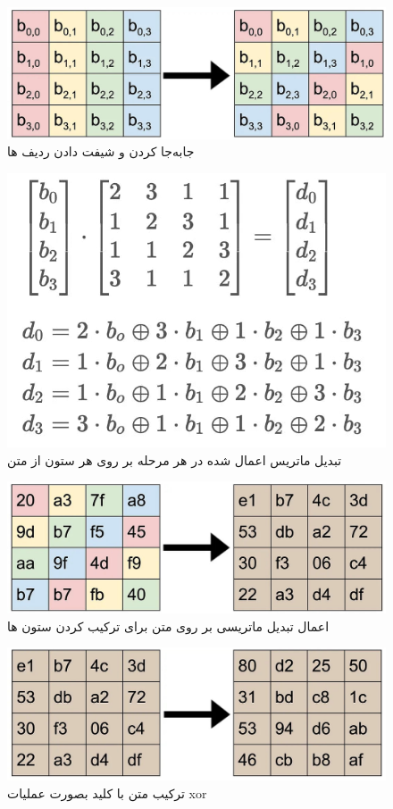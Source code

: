 \begin{figure}[h!]
    \centering
    \includegraphics[width=0.5\linewidth]{images/Shift rows.jpg}
    \caption{جابه‌جا کردن و شیفت دادن ردیف ها }
    \label{fig:addshift}
\end{figure}

\begin{figure}[h!]
    \centering
    \includegraphics[width=0.5\linewidth]{images/transformation.jpg}
    \caption{تبدیل ماتریس اعمال شده در هر مرحله بر روی هر ستون از متن}
    \label{fig:transform}
\end{figure}

\begin{figure}[h!]
    \centering
    \includegraphics[width=0.5\linewidth]{images/add transformation.jpg}
    \caption{اعمال تبدیل ماتریسی بر روی متن برای ترکیب کردن ستون ها}
    \label{fig:addtransfor}
\end{figure}

\begin{figure}[h!]
    \centering
    \includegraphics[width=0.5\linewidth]{images/add_key.jpg}
    \caption{ترکیب متن با کلید بصورت عملیات xor}
    \label{fig:addkey}
\end{figure}
\newpage

